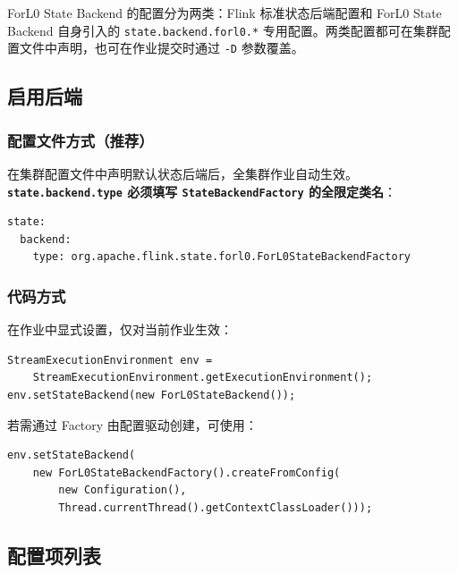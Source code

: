 \documentclass[a4paper,11pt]{article}
\newcommand{\project}{ForL0 State Backend}
\begin{document}
\project{} 的配置分为两类：Flink 标准状态后端配置和 \project{} 自身引入的 \texttt{state.backend.forl0.*} 专用配置。两类配置都可在集群配置文件中声明，也可在作业提交时通过 \texttt{-D} 参数覆盖。

\subsection{启用后端}

\subsubsection{配置文件方式（推荐）}

在集群配置文件中声明默认状态后端后，全集群作业自动生效。\textbf{\texttt{state.backend.type} 必须填写 \texttt{StateBackendFactory} 的全限定类名}：

\begin{lstlisting}[language=yamlcmd]
state:
  backend:
    type: org.apache.flink.state.forl0.ForL0StateBackendFactory
\end{lstlisting}

\subsubsection{代码方式}

在作业中显式设置，仅对当前作业生效：

\begin{lstlisting}[language=javalang]
StreamExecutionEnvironment env =
    StreamExecutionEnvironment.getExecutionEnvironment();
env.setStateBackend(new ForL0StateBackend());
\end{lstlisting}

若需通过 Factory 由配置驱动创建，可使用：

\begin{lstlisting}[language=javalang]
env.setStateBackend(
    new ForL0StateBackendFactory().createFromConfig(
        new Configuration(),
        Thread.currentThread().getContextClassLoader()));
\end{lstlisting}

\subsection{配置项列表}
\end{document}
